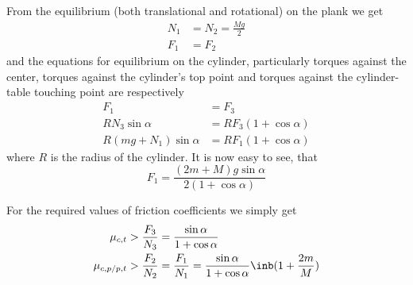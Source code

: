 From the equilibrium (both translational and rotational) on the plank we get
\begin{equation}
\begin{split}
    N_1 &= N_2 = \frac{Mg}{2} \\
    F_1 &= F_2    
\end{split}
\end{equation}
and the equations for equilibrium on the cylinder,
particularly torques against the center,
torques against the cylinder's top point and
torques against the cylinder-table touching point are respectively
\begin{equation}
\begin{split}
    F_1 &= F_3 \\
    R N_3 \sin{\alpha} &= R F_3 (1 + \cos{\alpha}) \\
    R (mg + N_1) \sin{\alpha} &= R F_1 (1 + \cos{\alpha})
\end{split}
\end{equation}
where $R$ is the radius of the cylinder.
It is now easy to see, that
\begin{equation}
    F_1 = \frac{(2m + M) g \sin{\alpha}}{2 (1 + \cos{\alpha})}
\end{equation}

For the required values of friction coefficients we simply get
\begin{equation}
\begin{split}
    \mu_{c,t} &> \frac{F_3}{N_3} = \frac{\sin{\alpha}}{1 + \cos{\alpha}} \\
    \mu_{c,p / p,t} &> \frac{F_2}{N_2} = \frac{F_1}{N_1} = \frac{\sin{\alpha}}{1 + \cos{\alpha}} \inb({1 + \frac{2m}{M}})
\end{split}
\end{equation}
